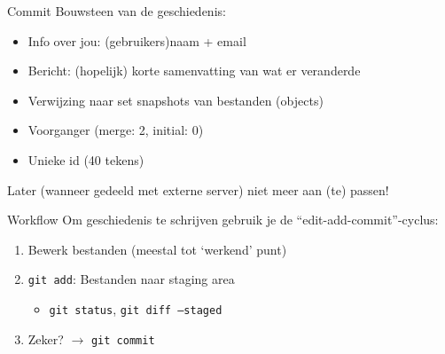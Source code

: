 \begin{frame}{Commit}
	Bouwsteen van de geschiedenis:
	\begin{itemize}
		\item Info over jou: (gebruikers)naam + email
		\item Bericht: (hopelijk) korte samenvatting van wat er veranderde
		\item Verwijzing naar set snapshots van bestanden (objects)
		\item Voorganger (merge: 2, initial: 0)
		\item Unieke id (40 tekens)
	\end{itemize}
	\alert{Later (wanneer gedeeld met externe server) niet meer aan (te) passen!}
\end{frame}

\begin{frame}{Workflow}
	Om geschiedenis te schrijven gebruik je de ``edit-add-commit''-cyclus:
	\begin{enumerate}
		\item Bewerk bestanden (meestal tot `werkend' punt)
		\item \texttt{git add}: Bestanden naar staging area
		\begin{itemize}
			\item \texttt{git status}, \texttt{git diff --staged}
		\end{itemize}
		\item Zeker? $\rightarrow$ \texttt{git commit}
	\end{enumerate}
\end{frame}
